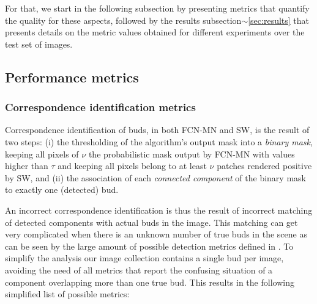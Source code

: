 \documentclass[a4paper,authoryear,review]{elsarticle}
\begin{document}
	For that, we start in the following subsection by presenting metrics that quantify the quality for these aspects, followed by the results subsection$\sim$\ref{sec:results} that presents details on the metric values obtained for different experiments over the test set of images. 
	
	
	\subsection{Performance metrics} \label{sec:metrics}
	
	
	
	
	
	\subsubsection{Correspondence identification metrics } \label{subsec:detectmetrics}
	
	Correspondence identification of buds, in both FCN-MN and SW, is the result of two steps: (i)  the thresholding of the algorithm’s output mask into a \emph{binary mask}, keeping all pixels of $\nu$ the probabilistic mask output by FCN-MN with values higher than $\tau$ and keeping all pixels belong to at least $\nu$ patches rendered positive by SW, and (ii) the association of each \emph{connected component} of the binary mask to exactly one (detected) bud. 
	
	An incorrect correspondence identification is thus the result of incorrect matching of detected components with actual buds in the image. This matching can get very complicated when there is an unknown number of true buds in the scene as can be seen by the large amount of possible detection metrics defined in \cite{oguz2017dice}. To simplify the analysis our image collection contains a single bud per image, avoiding the need of all metrics that report the confusing situation of a component overlapping more than one true bud. This results in the following simplified list of possible metrics:
	
\end{document}
